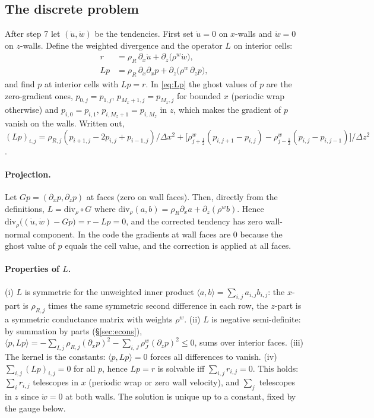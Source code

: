 \documentclass[11pt,a4paper]{article}
\begin{document}
\subsection{The discrete problem}
After step 7 let $(\dot u,\dot w)$ be the tendencies. First set $\dot u=0$ on $x$-walls and $\dot w=0$ on $z$-walls. Define the weighted divergence and the operator $L$ on interior cells:
\begin{align}
  r&=\rho_R\,\partial_x\dot u+\partial_z\big(\rho^w\dot w\big),\\
  Lp&=\rho_R\,\partial_x\partial_xp+\partial_z\big(\rho^w\,\partial_zp\big),
  \label{eq:Lp}
\end{align}
and find $p$ at interior cells with $Lp=r$. In \eqref{eq:Lp} the ghost values of $p$ are the zero-gradient ones, $p_{0,j}=p_{1,j}$, $p_{M_x+1,j}=p_{M_x,j}$ for bounded $x$ (periodic wrap otherwise) and $p_{i,0}=p_{i,1}$, $p_{i,M_z+1}=p_{i,M_z}$ in $z$, which makes the gradient of $p$ vanish on the walls.
Written out, $(Lp)_{i,j}=\rho_{R,j}(p_{i+1,j}-2p_{i,j}+p_{i-1,j})/\Delta x^2+\big[\rho^w_{j+\frac12}(p_{i,j+1}-p_{i,j})-\rho^w_{j-\frac12}(p_{i,j}-p_{i,j-1})\big]/\Delta z^2$.

\paragraph{Projection.} Let $G p=(\partial_xp,\partial_zp)$ at faces (zero on wall faces). Then, directly from the definitions, $L=\mathrm{div}_\rho\circ G$ where $\mathrm{div}_\rho(a,b)=\rho_R\partial_xa+\partial_z(\rho^wb)$. Hence
$\mathrm{div}_\rho\big((\dot u,\dot w)-Gp\big)=r-Lp=0$, and the corrected tendency has zero wall-normal component. In the code the gradients at wall faces are $0$ because the ghost value of $p$ equals the cell value, and the correction is applied at all faces.

\paragraph{Properties of $L$.} (i) $L$ is symmetric for the unweighted inner product $\langle a,b\rangle=\sum_{i,j}a_{i,j}b_{i,j}$: the $x$-part is $\rho_{R,j}$ times the same symmetric second difference in each row, the $z$-part is a symmetric conductance matrix with weights $\rho^w$.
(ii) $L$ is negative semi-definite: by summation by parts (\S\ref{sec:econs}), $\langle p,Lp\rangle=-\sum_{I,j}\rho_{R,j}(\partial_xp)^2-\sum_{i,J}\rho^w_J(\partial_zp)^2\le0$, sums over interior faces. (iii) The kernel is the constants: $\langle p,Lp\rangle=0$ forces all differences to vanish. (iv) $\sum_{i,j}(Lp)_{i,j}=0$ for all $p$, hence
$Lp=r$ is solvable iff $\sum_{i,j}r_{i,j}=0$. This holds: $\sum_ir_{i,j}$ telescopes in $x$ (periodic wrap or zero wall velocity), and $\sum_j$ telescopes in $z$ since $\dot w=0$ at both walls.
The solution is unique up to a constant, fixed by the gauge below.
\end{document}

